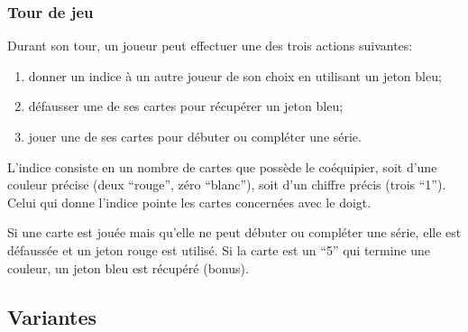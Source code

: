 \documentclass[11pt]{beamer}
\begin{document}
	
	\begin{frame}
		\frametitle{Tour de jeu}
		
		
		Durant son tour, un joueur peut effectuer une des trois actions suivantes:
		\begin{enumerate}
			\item donner un indice à un autre joueur de son choix en utilisant un jeton bleu;
			\item défausser une de ses cartes pour récupérer un jeton bleu;
			\item jouer une de ses cartes pour débuter ou compléter une série.
		\end{enumerate}
	
		\vspace*{1ex}
	
		L'indice consiste en un nombre de cartes que possède le coéquipier, soit d'une couleur précise (deux \enquote{rouge}, zéro \enquote{blanc}), soit d'un chiffre précis (trois \enquote{1}).
		Celui qui donne l'indice pointe les cartes concernées avec le doigt.
		
		
		\vspace*{1ex}
		
		
		Si une carte est jouée mais qu'elle ne peut débuter ou compléter une série, elle est défaussée et un jeton rouge est utilisé.
		Si la carte est un \enquote{5} qui termine une couleur, un jeton bleu est récupéré (bonus).
	\end{frame}



\subsection{Variantes}
\end{document}
